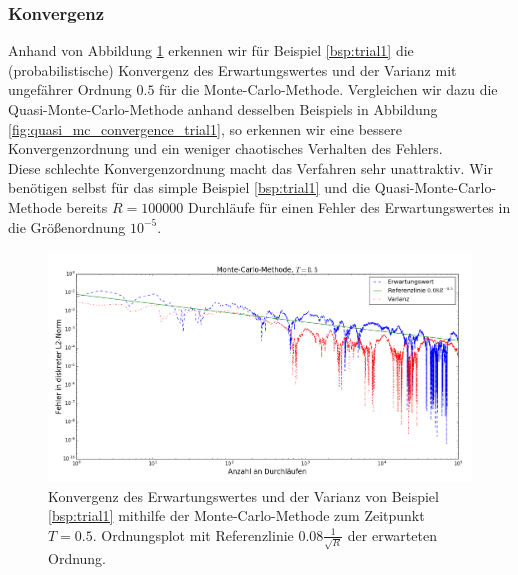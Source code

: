 \subsubsection*{Konvergenz}
Anhand von Abbildung \ref{fig:mc_convergence_trial1} erkennen wir für Beispiel \ref{bsp:trial1} die (probabilistische) Konvergenz des Erwartungswertes und der Varianz mit ungefährer Ordnung $0.5$ für die Monte-Carlo-Methode. Vergleichen wir dazu die Quasi-Monte-Carlo-Methode anhand desselben Beispiels in Abbildung \ref{fig:quasi_mc_convergence_trial1}, so erkennen wir eine bessere Konvergenzordnung und ein weniger chaotisches Verhalten des Fehlers.\\
Diese schlechte Konvergenzordnung macht das Verfahren sehr unattraktiv. Wir benötigen selbst für das simple Beispiel \ref{bsp:trial1} und die Quasi-Monte-Carlo-Methode bereits $R=100000$ Durchläufe für einen Fehler des Erwartungswertes in die Größenordnung $10^{-5}$.
\begin{figure}
\includegraphics[width=\textwidth]{Figures/mc_convergence_trial1.png}
\caption{Konvergenz des Erwartungswertes und der Varianz von Beispiel \ref{bsp:trial1} mithilfe der Monte-Carlo-Methode zum Zeitpunkt $T=0.5$. Ordnungsplot mit Referenzlinie $0.08\frac{1}{\sqrt{R}}$ der erwarteten Ordnung.}
\label{fig:mc_convergence_trial1}
\end{figure}\\
